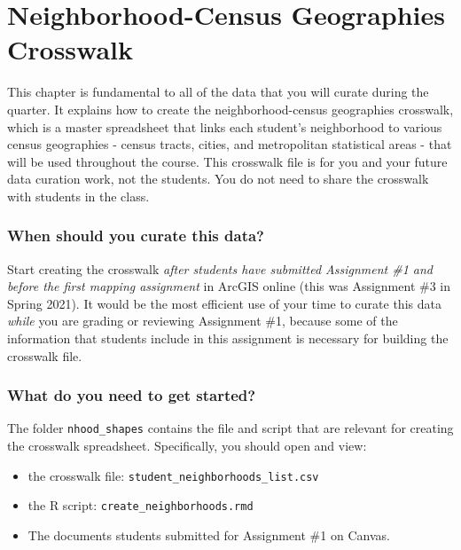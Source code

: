 \documentclass[
]{book}
\providecommand{\tightlist}{%
  \setlength{\itemsep}{0pt}\setlength{\parskip}{0pt}}
\begin{document}
\hypertarget{crosswalk}{%
\chapter{Neighborhood-Census Geographies Crosswalk}\label{crosswalk}}

This chapter is fundamental to all of the data that you will curate during the quarter. It explains how to create the neighborhood-census geographies crosswalk, which is a master spreadsheet that links each student's neighborhood to various census geographies - census tracts, cities, and metropolitan statistical areas - that will be used throughout the course. This crosswalk file is for you and your future data curation work, not the students. You do not need to share the crosswalk with students in the class.

\hypertarget{when-should-you-curate-this-data}{%
\subsection{When should you curate this data?}\label{when-should-you-curate-this-data}}

Start creating the crosswalk \emph{after students have submitted Assignment \#1 and before the first mapping assignment} in ArcGIS online (this was Assignment \#3 in Spring 2021). It would be the most efficient use of your time to curate this data \emph{while} you are grading or reviewing Assignment \#1, because some of the information that students include in this assignment is necessary for building the crosswalk file.

\hypertarget{what-do-you-need-to-get-started}{%
\subsection{What do you need to get started?}\label{what-do-you-need-to-get-started}}

The folder \texttt{nhood\_shapes} contains the file and script that are relevant for creating the crosswalk spreadsheet. Specifically, you should open and view:

\begin{itemize}
\tightlist
\item
  the crosswalk file: \texttt{student\_neighborhoods\_list.csv}
\item
  the R script: \texttt{create\_neighborhoods.rmd}
\item
  The documents students submitted for Assignment \#1 on Canvas.
\end{itemize}
\end{document}
